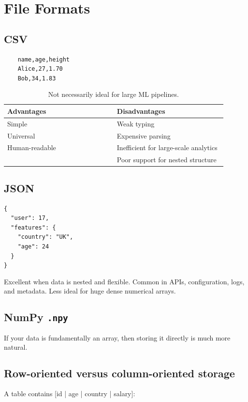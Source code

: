 \section{File Formats}
\label{sec:file-formats}

\subsection{CSV}

\begin{verbatim}
    name,age,height
    Alice,27,1.70
    Bob,34,1.83
\end{verbatim}

\begin{table}[h]
\centering
\begin{tabular}{p{0.45\linewidth} p{0.45\linewidth}}
\hline
\textbf{Advantages} & \textbf{Disadvantages} \\
\hline
Simple & Weak typing \\
Universal & Expensive parsing \\
Human-readable & Inefficient for large-scale analytics \\
 & Poor support for nested structure \\
\hline

\end{tabular}
\caption{Not necessarily ideal for large ML pipelines.}
\end{table}



\subsection{JSON}

\begin{verbatim}
{
  "user": 17,
  "features": {
    "country": "UK",
    "age": 24
  }
}
\end{verbatim}

Excellent when data is nested and flexible.
Common in APIs, configuration, logs, and metadata.
Less ideal for huge dense numerical arrays.

\subsection{NumPy \texttt{.npy}}
If your data is fundamentally an array, then storing it directly is much more natural.

\subsection{Row-oriented versus column-oriented storage}
\label{subsec:row-v-column}
A table contains [id | age | country | salary]:

